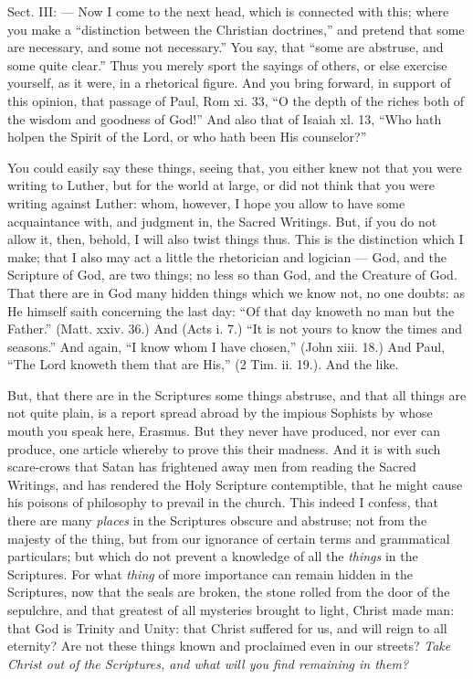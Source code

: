 
Sect. III: — Now I come to the next head, which is connected with this; where you make a “distinction between the Christian doctrines,” and pretend that some are necessary, and some not necessary.” You say, that “some are abstruse, and some quite clear.” Thus you merely sport the sayings of others, or else exercise yourself, as it were, in a rhetorical figure. And you bring forward, in support of this opinion, that passage of Paul, Rom xi. 33, “O the depth of the riches both of the wisdom and goodness of God!” And also that of Isaiah xl. 13, “Who hath holpen the Spirit of the Lord, or who hath been His counselor?”

You could easily say these things, seeing that, you either knew not that you were writing to Luther, but for the world at large, or did not think that you were writing against Luther: whom, however, I hope you allow to have some acquaintance with, and judgment in, the Sacred Writings. But, if you do not allow it, then, behold, I will also twist things thus. This is the distinction which I make; that I also may act a little the rhetorician and logician — God, and the Scripture of God, are two things; no less so than God, and the Creature of God. That there are in God many hidden things which we know not, no one doubts: as He himself saith concerning the last day: “Of that day knoweth no man but the Father.” (Matt. xxiv. 36.) And (Acts i. 7.) “It is not yours to know the times and seasons.” And again, “I know whom I have chosen,” (John xiii. 18.) And Paul, “The Lord knoweth them that are His,” (2 Tim. ii. 19.). And the like.

But, that there are in the Scriptures some things abstruse, and that all things are not quite plain, is a report spread abroad by the impious Sophists by whose mouth you speak here, Erasmus. But they never have produced, nor ever can produce, one article whereby to prove this their madness. And it is with such scare-crows that Satan has frightened away men from reading the Sacred Writings, and has rendered the Holy Scripture contemptible, that he might cause his poisons of philosophy to prevail in the church. This indeed I confess, that there are many \emph{places }in the Scriptures obscure and abstruse; not from the majesty of the thing, but from our ignorance of certain terms and grammatical particulars; but which do not prevent a knowledge of all the \emph{things }in the Scriptures. For what \emph{thing }of more importance can remain hidden in the Scriptures, now that the seals are broken, the stone rolled from the door of the sepulchre, and that greatest of all mysteries brought to light, Christ made man: that God is Trinity and Unity: that Christ suffered for us, and will reign to all eternity? Are not these things known and proclaimed even in our streets? \emph{Take Christ out of the Scriptures, and what will you find remaining in them?}

